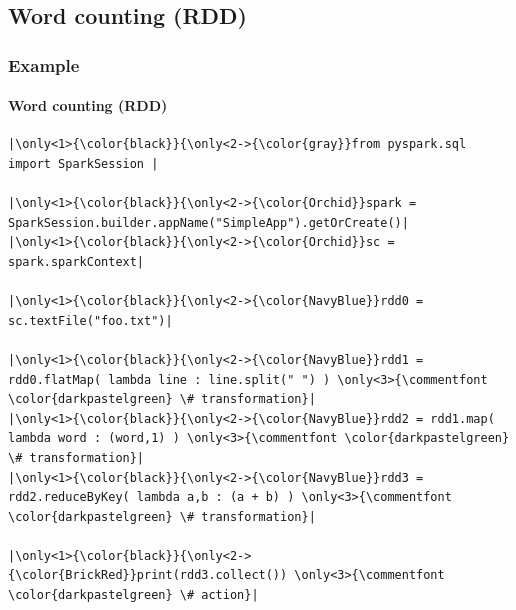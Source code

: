 \documentclass[aspectratio=169,usenames,dvipsnames]{beamer}
\begin{document}
\subsection{Word counting (RDD)}
    \begin{frame}[fragile]
        \frametitle{Example}
        \framesubtitle{Word counting (RDD)}
        \begin{center}

        \begin{minipage}{0.8\textwidth}
\begin{lstlisting}[escapechar={|}, title=wordcount.py]
|\only<1>{\color{black}}{\only<2->{\color{gray}}from pyspark.sql import SparkSession |

|\only<1>{\color{black}}{\only<2->{\color{Orchid}}spark = SparkSession.builder.appName("SimpleApp").getOrCreate()|
|\only<1>{\color{black}}{\only<2->{\color{Orchid}}sc = spark.sparkContext|

|\only<1>{\color{black}}{\only<2->{\color{NavyBlue}}rdd0 = sc.textFile("foo.txt")|

|\only<1>{\color{black}}{\only<2->{\color{NavyBlue}}rdd1 = rdd0.flatMap( lambda line : line.split(" ") ) \only<3>{\commentfont \color{darkpastelgreen} \# transformation}|
|\only<1>{\color{black}}{\only<2->{\color{NavyBlue}}rdd2 = rdd1.map( lambda word : (word,1) ) \only<3>{\commentfont \color{darkpastelgreen} \# transformation}| 
|\only<1>{\color{black}}{\only<2->{\color{NavyBlue}}rdd3 = rdd2.reduceByKey( lambda a,b : (a + b) ) \only<3>{\commentfont \color{darkpastelgreen} \# transformation}|

|\only<1>{\color{black}}{\only<2->{\color{BrickRed}}print(rdd3.collect()) \only<3>{\commentfont \color{darkpastelgreen} \# action}|
\end{lstlisting}
\end{minipage}
\end{center}
    \end{frame}
\end{document}
